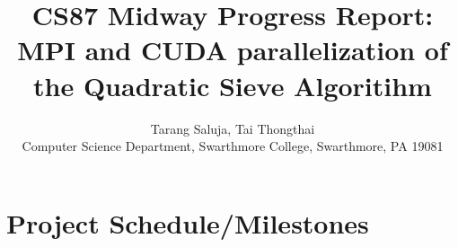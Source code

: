\documentclass[11pt]{article}
\begin{document}
\title{CS87 Midway Progress Report: MPI and CUDA parallelization of the Quadratic Sieve Algoritihm}

\author{Tarang Saluja, Tai Thongthai \\
Computer Science Department, Swarthmore College, Swarthmore, PA  19081}

\maketitle

\section{Project Schedule/Milestones}


\end{document}
